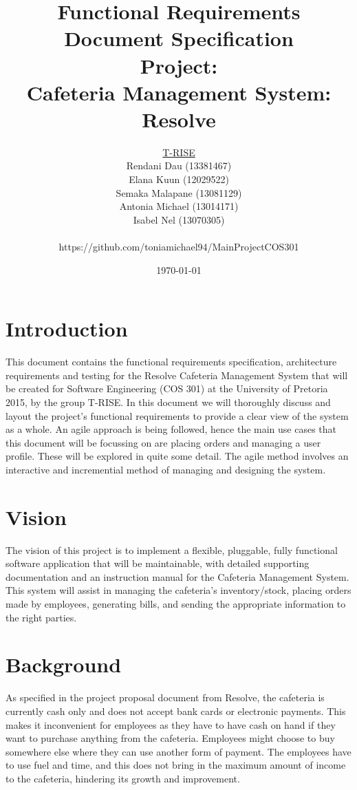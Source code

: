 \documentclass[a4paper,12pt]{article}
\title{\Huge Functional Requirements Document Specification \\ 
	 Project: \\ 
	Cafeteria Management System: Resolve}
\author{
         \underline{T-RISE}\\
          Rendani Dau (13381467) \\
	Elana Kuun (12029522) \\
	Semaka Malapane (13081129) \\
	Antonia Michael (13014171) \\
	Isabel Nel (13070305)\\ \\
	https://github.com/toniamichael94/MainProjectCOS301}
\date{\today}
\begin{document}
\maketitle
\break

\tableofcontents
\break


\section{Introduction}
This document contains the functional requirements specification, architecture requirements and testing for the Resolve Cafeteria Management System that will be created for Software Engineering (COS 301) at the University of Pretoria 2015, by the group T-RISE. In this document we will thoroughly discuss and layout the project's functional requirements to provide a clear view of the system as a whole. An agile approach is being followed, hence the main use cases that this document will be focussing on are placing orders and managing a user profile. These will be explored in quite some detail.  The agile method involves an interactive and incremential method of managing and designing the system. 
\section{Vision}
The vision of this project is to implement a flexible, pluggable, fully functional software application that will be maintainable, with detailed supporting documentation and an instruction manual for the Cafeteria Management System. This system will assist in managing the cafeteria's inventory/stock, placing orders made by employees, generating bills, and sending the appropriate information to the right parties.  

\section{Background}
As specified in the project proposal document from Resolve, the cafeteria is currently cash only and does not accept bank cards or electronic payments. This makes it inconvenient for employees as they have to have cash on hand if they want to purchase anything from the cafeteria. Employees might choose to buy somewhere else where they can use another form of payment. The employees have to use fuel and time, and this does not bring in the maximum amount of income to the cafeteria, hindering its growth and improvement.\\
\end{document}
